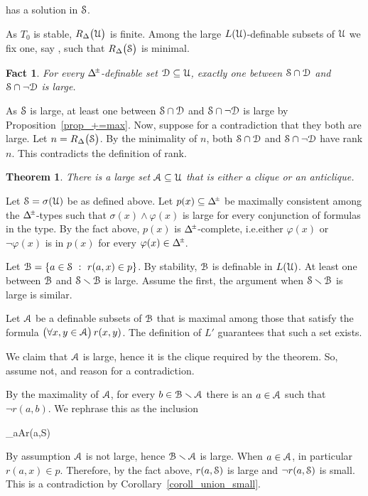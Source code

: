 \documentclass[10pt,oneside, openany]{book}
\renewcommand*{\emph}[1]{%
   \smash{\tikz[baseline]\node[rectangle, fill=green!40, rounded corners, inner xsep=0.5ex, inner ysep=0.2ex, anchor=base, minimum height = 2.7ex]{#1};}}
\def\A{\forall}
\def\pmDelta{\Delta\hskip-.3ex\raisebox{1ex}{\tiny$\pm$}}
\def\sm{\smallsetminus}
\def\D{\EuScript D}
\def\Aa{\EuScript A}
\def\U{\EuScript U}
\def\B{\EuScript B}
\def\S{\EuScript S}
\def\phi{\varphi}
\newcounter{thm}[chapter]
\theoremstyle{mio}
\newtheorem{theorem}[thm]{Theorem}
\newtheorem{fact}[thm]{Fact}
\theoremstyle{liscio}
\def\QED{\noindent\nolinebreak[4]\hfill\rlap{\ \ $\Box$}\medskip}
\renewenvironment{proof}[1][Proof]%
{\smallskip\begin{trivlist}\item[\hskip\labelsep {\bf #1}]}
{\QED\end{trivlist}}
\begin{document}
has a solution in $\S$.

As $T_0$ is stable, $R_\Delta\big(\U\big)$ is finite.
%
Among the large $L(\U)$-definable subsets of $\U$ we fix one, say \emph{$\S=\sigma(\U)$}, such that $R_\Delta\big(\S\big)$ is minimal.

\begin{fact}
  For every $\pmDelta$-definable set $\D\subseteq\U$, exactly one between $\S\cap\D$ and $\S\cap\neg\D$ is large.
\end{fact}

\begin{proof}
  As $\S$ is large, at least one between $\S\cap\D$ and $\S\cap\neg\D$ is large by Proposition~\ref{prop_+=max}.
  Now, suppose for a contradiction that they both are large.
  Let $n=R_\Delta\big(\S\big)$.
  By the minimality of $n$, both $\S\cap\D$ and $\S\cap\neg\D$ have rank $n$.
  This contradicts the definition of rank.
\end{proof}

\begin{theorem}
  There is a large set $\Aa\subseteq\U$ that is either a clique or an anticlique.
\end{theorem}

\begin{proof}
  Let $\S=\sigma(\U)$ be as defined above.
  Let $p(x)\subseteq\pmDelta$ be maximally consistent among the $\pmDelta$-types such that $\sigma(x)\wedge\phi(x)$ is large for every conjunction of formulas in the type.
  By the fact above, $p(x)$ is $\pmDelta$-complete, i.e.\@ either $\phi(x)$ or $\neg\phi(x)$ is in $p(x)$ for every $\phi(x)\in\pmDelta$.


  Let $\B=\{a\in\S\ :\ r(a,x)\in p\}$.
  By stability, $\B$ is definable in $L(\U)$.
  At least one between $\B$ and $\S\sm\B$ is large.
  Assume the first, the argument when $\S\sm\B$ is large is similar.

  Let $\Aa$ be a definable subsets of $\B$ that is maximal among those that satisfy the formula $\big(\A x,y\in\Aa\big)\,r(x,y)$.
  The definition of $L'$ guarantees that such a set exists.
  
  We claim that $\Aa$ is large, hence it is the clique required by the theorem.
  So, assume not, and reason for a contradiction.

  By the maximality of $\Aa$, for every $b\in\B\sm\Aa$ there is an $a\in\Aa$ such that $\neg r(a,b)$.
  We rephrase this as the inclusion

  \ceq{\hfill\B\sm\Aa}
  {\subseteq}
  {\bigcup_{a\in\Aa}\neg r(a,\S)}

  By assumption $\Aa$ is not large, hence $\B\sm\Aa$ is large.
  When $a\in\Aa$, in particular $r(a,x)\in p$.
  Therefore, by the fact above, $r(a,\S)$ is large and $\neg r(a,\S)$ is small.
  This is a contradiction by Corollary~\ref{coroll_union_small}.
\end{proof}
\end{document}
